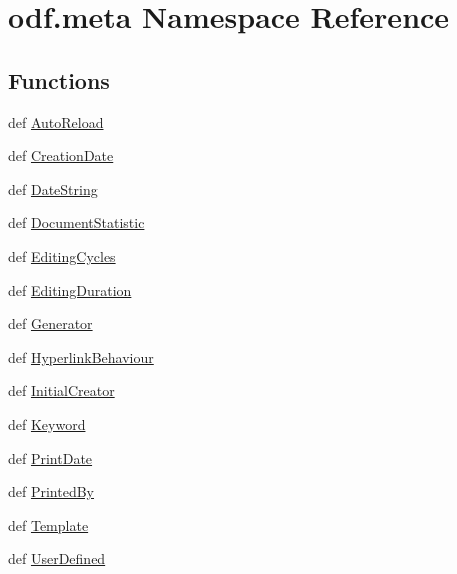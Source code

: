 \hypertarget{namespaceodf_1_1meta}{\section{odf.\+meta Namespace Reference}
\label{namespaceodf_1_1meta}
}
\subsection*{Functions}
\begin{DoxyCompactItemize}
\item 
def \hyperlink{namespaceodf_1_1meta_a56f8e703d81c98e516a4964b2381b869}{Auto\+Reload}
\item 
def \hyperlink{namespaceodf_1_1meta_a8030344c0edaa27ab1176185dd0144b2}{Creation\+Date}
\item 
def \hyperlink{namespaceodf_1_1meta_a567835aab7fba93aa9ce9f659fe20e12}{Date\+String}
\item 
def \hyperlink{namespaceodf_1_1meta_a3e9b0f205c9211c3c31452aeca178a08}{Document\+Statistic}
\item 
def \hyperlink{namespaceodf_1_1meta_a782529060de4047c0337ad45a927af74}{Editing\+Cycles}
\item 
def \hyperlink{namespaceodf_1_1meta_aef8041b653eb35c475a9d5a00d685dab}{Editing\+Duration}
\item 
def \hyperlink{namespaceodf_1_1meta_af358679847dc4f8640f812b78207eac5}{Generator}
\item 
def \hyperlink{namespaceodf_1_1meta_ae013d09a62e1a8a664262af49719bc53}{Hyperlink\+Behaviour}
\item 
def \hyperlink{namespaceodf_1_1meta_a734ee7748a850249d7aa80f8b240bfd6}{Initial\+Creator}
\item 
def \hyperlink{namespaceodf_1_1meta_a49e6c8de501570010e6361810100ae31}{Keyword}
\item 
def \hyperlink{namespaceodf_1_1meta_a47ca1c2ae0f21de9edb7936f2d637924}{Print\+Date}
\item 
def \hyperlink{namespaceodf_1_1meta_a1c2b90d3c21ff51af4db4221f53aff70}{Printed\+By}
\item 
def \hyperlink{namespaceodf_1_1meta_a2315ca939af7c164b441e1ef3def6530}{Template}
\item 
def \hyperlink{namespaceodf_1_1meta_a54f5d4628158f4535d6d80212213b6df}{User\+Defined}
\end{DoxyCompactItemize}


